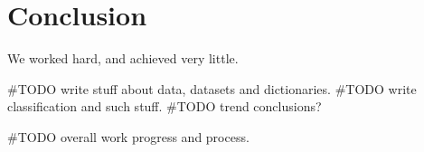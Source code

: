 \chapter{Conclusion}\label{conclusion}
We worked hard, and achieved very little.


#TODO write stuff about data, datasets and dictionaries.
#TODO write classification and such stuff. 
#TODO trend conclusions?

#TODO overall work progress and process. 

